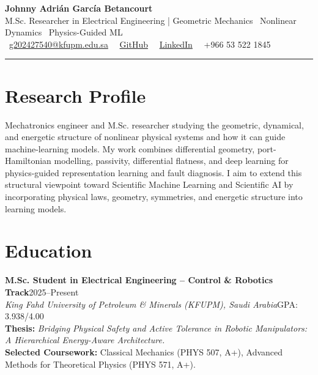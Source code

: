 \documentclass[10pt,a4paper]{article}
\newcommand{\entrytitle}[2]{%
  \textbf{#1}\hfill\textcolor{metacolor}{\small #2}%
}
\newcommand{\entryinst}[2]{%
  \textit{#1}\hfill{\small #2}%
}
\begin{document}
\pagestyle{empty}


{\fontsize{20}{23}\selectfont\textbf{Johnny Adrián García Betancourt}}\\[2pt]
{\normalsize M.Sc. Researcher in Electrical Engineering | Geometric Mechanics \textbullet\ Nonlinear Dynamics \textbullet\ Physics-Guided ML}\\[2pt]
{\small
  \textbullet\ \href{mailto:g202427540@kfupm.edu.sa}{g202427540@kfupm.edu.sa}
  \ \textbullet\ \href{https://github.com/johnnyzxc5}{GitHub}
  \ \textbullet\ \href{https://www.linkedin.com/in/johnnygarciabet}{LinkedIn}
  \ \textbullet\ +966 53 522 1845
}\\[3.5pt]
{\color{primary}\rule{\textwidth}{0.9pt}}
\vspace{-3pt}

\section*{Research Profile}
Mechatronics engineer and M.Sc. researcher studying the geometric, dynamical, and energetic structure of nonlinear physical systems and how it can guide machine-learning models. My work combines differential geometry, port-Hamiltonian modelling, passivity, differential flatness, and deep learning for physics-guided representation learning and fault diagnosis. I aim to extend this structural viewpoint toward Scientific Machine Learning and Scientific AI by incorporating physical laws, geometry, symmetries, and energetic structure into learning models.

\vspace{7pt}
\section*{Education}

\entrytitle{M.Sc. Student in Electrical Engineering -- Control \& Robotics Track}{2025--Present}\\
\entryinst{King Fahd University of Petroleum \& Minerals (KFUPM), Saudi Arabia}{GPA: 3.938/4.00}\\
\textbf{Thesis:} \textit{Bridging Physical Safety and Active Tolerance in Robotic Manipulators: A Hierarchical Energy-Aware Architecture.}\\
\textbf{Selected Coursework:} Classical Mechanics (PHYS 507, A+), Advanced Methods for Theoretical Physics (PHYS 571, A+).
\end{document}
